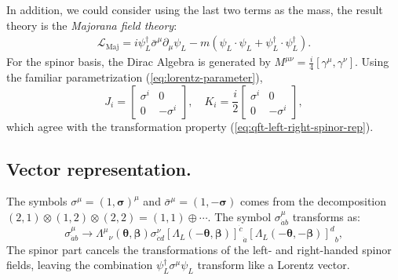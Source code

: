 \documentclass[aps,prb,superscriptaddress,nofootinbib]{revtex4}
\begin{document}
In addition, we could consider using the last two terms as the mass, the result theory is the \textit{Majorana field theory}:
\begin{equation}
\begin{aligned}
	\mathcal{L}_{\mathrm{Maj}}
	= i \psi_L^\dagger \bar\sigma^\mu \partial_\mu  \psi_L -m(\psi_L \cdot \psi_L + \psi_L^\dagger \cdot \psi_L^\dagger).
\end{aligned}
\end{equation} 
For the spinor basis, the Dirac Algebra is generated by $M^{\mu\nu} = \frac{i}{4}[\gamma^\mu, \gamma^\nu]$.
Using the familiar parametrization (\ref{eq:lorentz-parameter}), 
\begin{equation}
	J_i = \begin{bmatrix}
		\sigma^i & 0 \\ 0 & -\sigma^i
	\end{bmatrix}, \quad 
	K_i = \frac{i}{2}\begin{bmatrix}
		\sigma^i & 0 \\ 0 & -\sigma^i
	\end{bmatrix},
\end{equation}
which agree with the transformation property (\ref{eq:qft-left-right-spinor-rep}).


\subsection{Vector representation.}
The symbols $\sigma^\mu = (1, \bm \sigma)^\mu$ and $\bar\sigma^\mu=(1,-\bm\sigma)$ comes from the decomposition $\left(2, 1\right) \otimes \left(1,2\right) \otimes \left(2, 2\right) = \left(1, 1\right) \oplus \cdots$.
The symbol $\sigma^\mu_{\dot a b}$ transforms as:
\begin{equation}\label{eq:RFT-sigma_symbol}
	\sigma^\mu_{\dot a b} \rightarrow
	{\Lambda^\mu}_\nu(\bm\theta,\bm\beta) \sigma^\nu_{\dot c d}
	{\left[\Lambda_L(-\bm\theta, \bm\beta)\right]^{\dot c}}_{\dot a} {\left[\Lambda_L(-\bm\theta, -\bm\beta)\right]^d}_b,
\end{equation}
The spinor part cancels the transformations of the left- and right-handed spinor fields, leaving the combination $\psi_L^\dagger \sigma^\mu \psi_L$ transform like a Lorentz vector.
\end{document}
